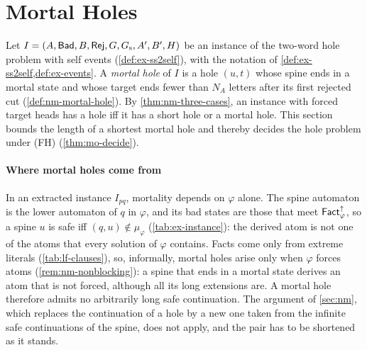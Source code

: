 
\section{Mortal Holes}\label{sec:mo}

Let $I=(A,\mathsf{Bad},B,\mathsf{Rej},G,G_{\mathrm{s}},A',B',H)$ be an instance of the
two-word hole problem with self events (\cref{def:ex-ss2self}), with the
notation of \cref{def:ex-ss2self,def:ex-events}. A \emph{mortal hole} of $I$
is a hole $(u,t)$ whose spine ends in a mortal state and whose target ends
fewer than $N_A$ letters after its first rejected cut
(\cref{def:nm-mortal-hole}). By \cref{thm:nm-three-cases}, an instance with
forced target heads has a hole iff it has a short hole or a mortal hole. This
section bounds the length of a shortest mortal hole and thereby decides the
hole problem under (FH) (\cref{thm:mo-decide}).

\paragraph{Where mortal holes come from}
In an extracted instance $I_{pq}$, mortality depends on $\varphi$ alone. The
spine automaton is the lower automaton of $q$ in $\varphi$, and its bad states
are those that meet $\mathsf{Fact}^{\uparrow}_{\varphi}$, so a spine $u$ is safe iff
$(q,u)\notin\mu_\varphi$ (\cref{tab:ex-instance}): the derived atom is not one
of the atoms that every solution of $\varphi$ contains. Facts come only from
extreme literals (\cref{tab:lf-clauses}), so, informally, mortal holes arise
only when $\varphi$ forces atoms (\cref{rem:nm-nonblocking}): a spine that
ends in a mortal state derives an atom that is not forced, although all its
long extensions are. A mortal hole therefore admits no arbitrarily long safe
continuation. The argument of \cref{sec:nm}, which replaces the continuation of a
hole by a new one taken from the infinite safe continuations of the spine,
does not apply, and the pair has to be shortened as it stands.

